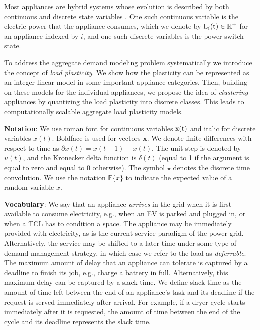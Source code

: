 \documentclass[10pt]{IEEEtran}
\begin{document}
Most appliances are hybrid systems whose evolution is described by both continuous and discrete state variables \cite{alur1993hybrid}. 
One such continuous variable is the electric power that the appliance consumes, which we denote by ${\rm L}_i({\rm t})\in \mathbb{R}^{+}$ for an appliance indexed by $i$, and one such discrete variables is the power-switch state.  

To address the aggregate demand modeling problem systematically we introduce the concept of {\it load plasticity}. We show how the plasticity can be represented as an integer linear model in some important appliance categories.  
Then, building on these models for the individual appliances, we propose the idea of {\it clustering} appliances by quantizing the load plasticity into discrete classes. This leads to computationally scalable aggregate load plasticity models.

{\bf Notation}: We use roman font  for continuous variables $\rm x(t)$ and italic for discrete variables $x(t)$. Boldface
is used for vectors $\boldsymbol{x}$. We denote finite differences with respect to time as $\partial x(t)=x(t+1)-x(t)$. The unit step is denoted by $u(t)$, and   the Kronecker delta function is $\delta(t)$ (equal to 1 if the argument is equal to zero and equal to 0 otherwise). 
The symbol $\star$ denotes the discrete time convolution.  We use the notation ${\mathbb E}\{x\}$ to indicate
the expected value of a random variable $x$.

{\bf Vocabulary}: We say that an appliance {\it arrives} in the grid when it is first available to consume electricity, e.g., when an EV is parked and plugged in, or when a TCL  has to condition a space. The appliance may be immediately provided with electricity, as is the current service paradigm of the power grid. Alternatively, the service may be shifted to a later time under some type of demand management strategy, in which case we refer to the load as {\it deferrable}. The maximum amount of delay that an appliance can tolerate is captured by a deadline to finish its job, e.g., charge a battery in full. Alternatively, this maximum delay can be captured by a slack time. We define slack time as the amount of
time left between the end of an appliance's task and its deadline if the request is served immediately after arrival. For example, if a dryer cycle starts immediately after it is requested, the amount of time between the end of the cycle and its deadline represents the slack time.

\vspace{-0.3cm}
\end{document}
